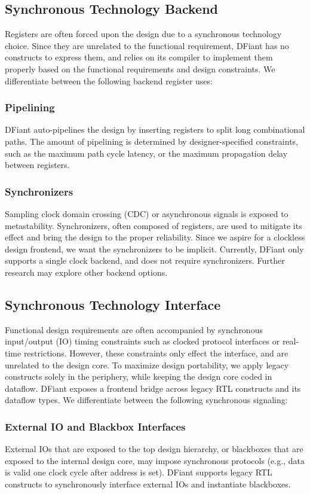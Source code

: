 \subsection{Synchronous Technology Backend}
Registers are often forced upon the design due to a synchronous technology choice. Since they are unrelated to the functional requirement, DFiant has no constructs to express them, and relies on its compiler to implement them properly based on the functional requirements and design constraints.
We differentiate between the following backend register uses:
\subsubsection{Pipelining}
DFiant auto-pipelines the design by inserting registers to split long combinational paths. The amount of pipelining is determined by designer-specified constraints, such as the maximum path cycle latency, or the maximum propagation delay between registers.
\subsubsection{Synchronizers}
Sampling clock domain crossing (CDC) or asynchronous signals is exposed to metastability. Synchronizers, often composed of registers, are used to mitigate its effect and bring the design to the proper reliability. Since we aspire for a clockless design frontend, we want the synchronizers to be implicit. Currently, DFiant only supports a single clock backend, and does not require synchronizers. Further research may explore other backend options.

\subsection{Synchronous Technology Interface}
Functional design requirements are often accompanied by synchronous input/output (IO) timing constraints such as clocked protocol interfaces or real-time restrictions. However, these constraints only effect the interface, and are unrelated to the design core. To maximize design portability, we apply legacy constructs solely in the periphery, while keeping the design core coded in dataflow. DFiant exposes a frontend bridge across legacy RTL constructs and its dataflow types. We differentiate between the following synchronous signaling:
\subsubsection{External IO and Blackbox Interfaces}
External IOs that are exposed to the top design hierarchy, or blackboxes that are exposed to the internal design core, may impose synchronous protocols (e.g., data is valid one clock cycle after address is set). DFiant supports legacy RTL constructs to synchronously interface external IOs and instantiate blackboxes. 
